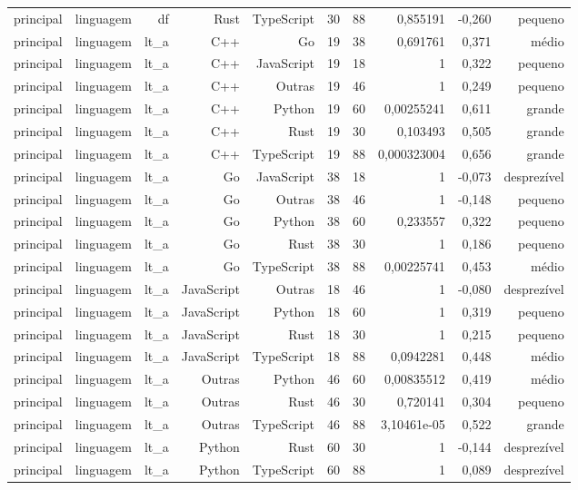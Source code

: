 \begin{tabular}{lrrrrrrrrr}
principal & linguagem & df & Rust & TypeScript & 30 & 88 & 0,855191 & -0,260 & pequeno \\
principal & linguagem & lt\_a & C++ & Go & 19 & 38 & 0,691761 & 0,371 & médio \\
principal & linguagem & lt\_a & C++ & JavaScript & 19 & 18 & 1 & 0,322 & pequeno \\
principal & linguagem & lt\_a & C++ & Outras & 19 & 46 & 1 & 0,249 & pequeno \\
principal & linguagem & lt\_a & C++ & Python & 19 & 60 & 0,00255241 & 0,611 & grande \\
principal & linguagem & lt\_a & C++ & Rust & 19 & 30 & 0,103493 & 0,505 & grande \\
principal & linguagem & lt\_a & C++ & TypeScript & 19 & 88 & 0,000323004 & 0,656 & grande \\
principal & linguagem & lt\_a & Go & JavaScript & 38 & 18 & 1 & -0,073 & desprezível \\
principal & linguagem & lt\_a & Go & Outras & 38 & 46 & 1 & -0,148 & pequeno \\
principal & linguagem & lt\_a & Go & Python & 38 & 60 & 0,233557 & 0,322 & pequeno \\
principal & linguagem & lt\_a & Go & Rust & 38 & 30 & 1 & 0,186 & pequeno \\
principal & linguagem & lt\_a & Go & TypeScript & 38 & 88 & 0,00225741 & 0,453 & médio \\
principal & linguagem & lt\_a & JavaScript & Outras & 18 & 46 & 1 & -0,080 & desprezível \\
principal & linguagem & lt\_a & JavaScript & Python & 18 & 60 & 1 & 0,319 & pequeno \\
principal & linguagem & lt\_a & JavaScript & Rust & 18 & 30 & 1 & 0,215 & pequeno \\
principal & linguagem & lt\_a & JavaScript & TypeScript & 18 & 88 & 0,0942281 & 0,448 & médio \\
principal & linguagem & lt\_a & Outras & Python & 46 & 60 & 0,00835512 & 0,419 & médio \\
principal & linguagem & lt\_a & Outras & Rust & 46 & 30 & 0,720141 & 0,304 & pequeno \\
principal & linguagem & lt\_a & Outras & TypeScript & 46 & 88 & 3,10461e-05 & 0,522 & grande \\
principal & linguagem & lt\_a & Python & Rust & 60 & 30 & 1 & -0,144 & desprezível \\
principal & linguagem & lt\_a & Python & TypeScript & 60 & 88 & 1 & 0,089 & desprezível \\

\end{tabular}
